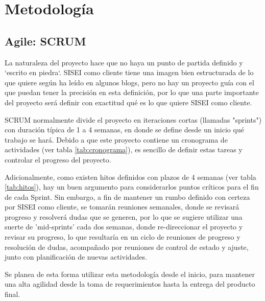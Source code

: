 
\section{Metodología}
  \subsection{Agile: SCRUM}
    La naturaleza del proyecto hace que no haya un punto de partida definido y `escrito en piedra`. SISEI como cliente tiene una imagen bien estructurada de lo que quiere según ha leído en algunos blogs, pero no hay un proyecto guía con el que puedan tener la precisión en esta definición, por lo que una parte importante del proyecto será definir con exactitud qué es lo que quiere SISEI como cliente.

    SCRUM normalmente divide el proyecto en iteraciones cortas (llamadas "sprints") con duración típica de 1 a 4 semanas, en donde se define desde un inicio qué trabajo se hará. Debido a que este proyecto contiene un cronograma de actividades (ver tabla \ref{tab:cronograma}), es sencillo de definir estas tareas y controlar el progreso del proyecto.

    Adicionalmente, como existen hitos definidos con plazos de 4 semanas (ver tabla \ref{tab:hitos}), hay un buen argumento para considerarlos puntos críticos para el fin de cada Sprint. Sin embargo, a fin de mantener un rumbo definido con certeza por SISEI como cliente, se tomarán reuniones semanales, donde se revisará progreso y resolverá dudas que se generen, por lo que se sugiere utilizar una suerte de 'mid-sprints' cada dos semanas, donde re-direccionar el proyecto y revisar su progreso, lo que resultaría en un ciclo de reuniones de progreso y resolución de dudas, acompañado por reuniones de control de estado y ajuste, junto con planificación de nuevas actividades.

    Se planea de esta forma utilizar esta metodología desde el inicio, para mantener una alta agilidad desde la toma de requerimientos hasta la entrega del producto final.

\clearpage
